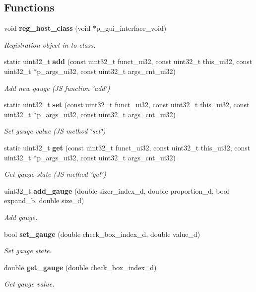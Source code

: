 \subsection*{Functions}
\begin{DoxyCompactItemize}
\item 
void \textbf{ reg\+\_\+host\+\_\+class} (void $\ast$p\+\_\+gui\+\_\+interface\+\_\+void)
\begin{DoxyCompactList}\small\item\em Registration object in to class. \end{DoxyCompactList}\item 
static uint32\+\_\+t \textbf{ add} (const uint32\+\_\+t funct\+\_\+ui32, const uint32\+\_\+t this\+\_\+ui32, const uint32\+\_\+t $\ast$p\+\_\+args\+\_\+ui32, const uint32\+\_\+t args\+\_\+cnt\+\_\+ui32)
\begin{DoxyCompactList}\small\item\em Add new gauge (JS function \char`\"{}add\char`\"{}) \end{DoxyCompactList}\item 
static uint32\+\_\+t \textbf{ set} (const uint32\+\_\+t funct\+\_\+ui32, const uint32\+\_\+t this\+\_\+ui32, const uint32\+\_\+t $\ast$p\+\_\+args\+\_\+ui32, const uint32\+\_\+t args\+\_\+cnt\+\_\+ui32)
\begin{DoxyCompactList}\small\item\em Set gauge value (JS method \char`\"{}set\char`\"{}) \end{DoxyCompactList}\item 
static uint32\+\_\+t \textbf{ get} (const uint32\+\_\+t funct\+\_\+ui32, const uint32\+\_\+t this\+\_\+ui32, const uint32\+\_\+t $\ast$p\+\_\+args\+\_\+ui32, const uint32\+\_\+t args\+\_\+cnt\+\_\+ui32)
\begin{DoxyCompactList}\small\item\em Get gauge state (JS method \char`\"{}get\char`\"{}) \end{DoxyCompactList}\item 
uint32\+\_\+t \textbf{ add\+\_\+gauge} (double sizer\+\_\+index\+\_\+d, double proportion\+\_\+d, bool expand\+\_\+b, double size\+\_\+d)
\begin{DoxyCompactList}\small\item\em Add gauge. \end{DoxyCompactList}\item 
bool \textbf{ set\+\_\+gauge} (double check\+\_\+box\+\_\+index\+\_\+d, double value\+\_\+d)
\begin{DoxyCompactList}\small\item\em Set gauge state. \end{DoxyCompactList}\item 
double \textbf{ get\+\_\+gauge} (double check\+\_\+box\+\_\+index\+\_\+d)
\begin{DoxyCompactList}\small\item\em Get gauge value. \end{DoxyCompactList}\end{DoxyCompactItemize}
